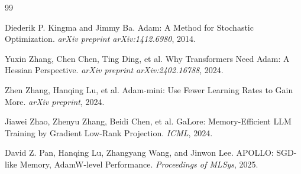 \documentclass[10pt]{article}
\begin{document}
\begin{thebibliography}{99}

Diederik P. Kingma and Jimmy Ba.
\newblock Adam: A Method for Stochastic Optimization.
\newblock \emph{arXiv preprint arXiv:1412.6980}, 2014.

Yuxin Zhang, Chen Chen, Ting Ding, et al.
\newblock Why Transformers Need Adam: A Hessian Perspective.
\newblock \emph{arXiv preprint arXiv:2402.16788}, 2024.

Zhen Zhang, Hanqing Lu, et al.
\newblock Adam-mini: Use Fewer Learning Rates to Gain More.
\newblock \emph{arXiv preprint}, 2024.

Jiawei Zhao, Zhenyu Zhang, Beidi Chen, et al.
\newblock GaLore: Memory-Efficient LLM Training by Gradient Low-Rank Projection.
\newblock \emph{ICML}, 2024.

David Z. Pan, Hanqing Lu, Zhangyang Wang, and Jinwon Lee.
\newblock APOLLO: SGD-like Memory, AdamW-level Performance.
\newblock \emph{Proceedings of MLSys}, 2025.

\end{thebibliography}
\end{document}
